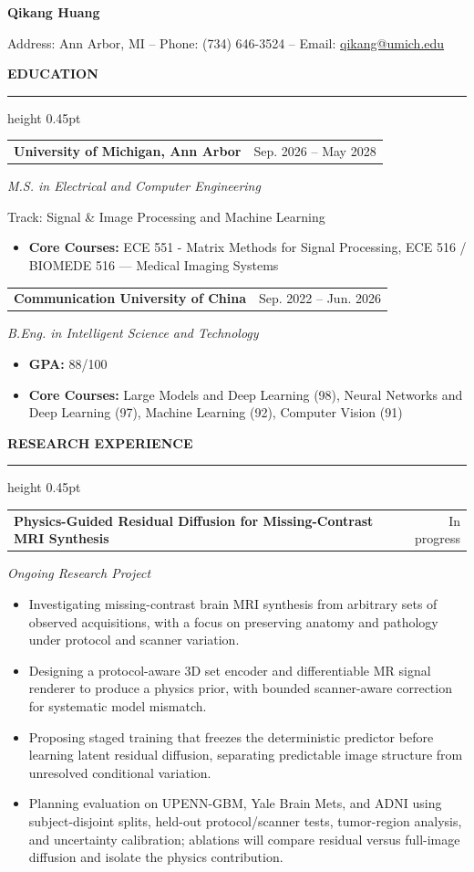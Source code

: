 \documentclass[10pt,a4paper]{article}
\makeatletter
\newcommand{\resumesection}[1]{%
  \par\vspace{6pt}%
  {\fontsize{12.8}{14}\selectfont\bfseries #1}\par
  \vspace{1pt}\hrule height 0.45pt\vspace{4pt}%
}
\newcommand{\datedheading}[2]{%
  \begin{tabular*}{\textwidth}{@{}p{0.79\textwidth}@{\extracolsep{\fill}}r@{}}
    \textbf{#1} & #2
  \end{tabular*}%
}
\newcommand{\roleline}[1]{%
  \vspace{0.5pt}\textit{#1}\par\vspace{0.5pt}%
}
\makeatother
\begin{document}
\fontsize{10.1}{12}\selectfont

\begin{center}
  {\fontsize{24}{26}\selectfont\bfseries Qikang Huang}\par
  \vspace{4pt}
  Address: Ann Arbor, MI \quad -- \quad Phone: (734) 646-3524 \quad -- \quad
  Email: \href{mailto:qikang@umich.edu}{qikang@umich.edu}
\end{center}
\vspace{-3pt}

\resumesection{EDUCATION}
\datedheading{University of Michigan, Ann Arbor}{Sep. 2026 -- May 2028}
\roleline{M.S. in Electrical and Computer Engineering}
Track: Signal \& Image Processing and Machine Learning
\begin{itemize}
  \item \textbf{Core Courses:} ECE 551 - Matrix Methods for Signal Processing, ECE 516 / BIOMEDE 516 --- Medical Imaging Systems
\end{itemize}

\vspace{3pt}
\datedheading{Communication University of China}{Sep. 2022 -- Jun. 2026}
\roleline{B.Eng. in Intelligent Science and Technology}
\begin{itemize}
  \item \textbf{GPA:} 88/100
  \item \textbf{Core Courses:} Large Models and Deep Learning (98), Neural Networks and Deep Learning (97), Machine Learning (92), Computer Vision (91)
\end{itemize}

\resumesection{RESEARCH EXPERIENCE}
\datedheading{Physics-Guided Residual Diffusion for Missing-Contrast MRI Synthesis}{In progress}
\roleline{Ongoing Research Project}
\begin{itemize}
  \item Investigating missing-contrast brain MRI synthesis from arbitrary sets of observed acquisitions, with a focus on preserving anatomy and pathology under protocol and scanner variation.
  \item Designing a protocol-aware 3D set encoder and differentiable MR signal renderer to produce a physics prior, with bounded scanner-aware correction for systematic model mismatch.
  \item Proposing staged training that freezes the deterministic predictor before learning latent residual diffusion, separating predictable image structure from unresolved conditional variation.
  \item Planning evaluation on UPENN-GBM, Yale Brain Mets, and ADNI using subject-disjoint splits, held-out protocol/scanner tests, tumor-region analysis, and uncertainty calibration; ablations will compare residual versus full-image diffusion and isolate the physics contribution.
\end{itemize}
\end{document}
